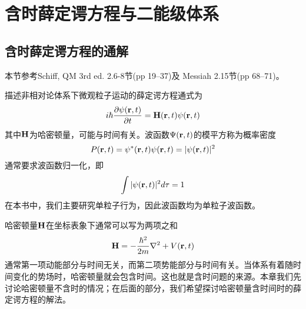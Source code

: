 
\chapter{含时薛定谔方程与二能级体系}
\label{cpt:1}
\section{含时薛定谔方程的通解}
\begin{framed}
本节参考Schiff, QM 3rd ed. 2.6-8节(pp 19--37)及 Messiah 2.15节(pp 68--71)。
\end{framed}

描述非相对论体系下微观粒子运动的薛定谔方程通式为
\begin{equation}\label{eqn:tdsefull}
i\hbar \dfrac{\partial \psi(\bm{\mathrm{r}},t)}{\partial t}=\bm{\mathrm{H}}(\bm{\mathrm{r}},t) \psi(\bm{\mathrm{r}},t)
\end{equation}
其中$ \bm{\mathrm{H}} $为哈密顿量，可能与时间有关。波函数$ \Psi(\bm{\mathrm{r}},t) $的模平方称为概率密度
\begin{equation}\label{key}
P(\bm{\mathrm{r}},t)=\psi^*(\bm{\mathrm{r}},t)\psi(\bm{\mathrm{r}},t)=|\psi(\bm{\mathrm{r}},t)|^2
\end{equation}
通常要求波函数归一化，即
\begin{equation}\label{key}
\int |\psi(\bm{\mathrm{r}},t)|^2d\tau=1
\end{equation}
在本书中，我们主要研究单粒子行为，因此波函数均为单粒子波函数。

哈密顿量$ \bm{\mathrm{H}} $在坐标表象下通常可以写为两项之和
\begin{equation}\label{key}
\bm{\mathrm{H}}=-\dfrac{\hbar^2}{2m}\nabla^2+V(\bm{\mathrm{r}},t)
\end{equation}
通常第一项动能部分与时间无关，而第二项势能部分与时间有关。当体系有着随时间变化的势场时，哈密顿量就会包含时间。这也就是含时问题的来源。本章我们先讨论哈密顿量不含时的情况；在后面的部分，我们希望探讨哈密顿量含时间时的薛定谔方程的解法。

